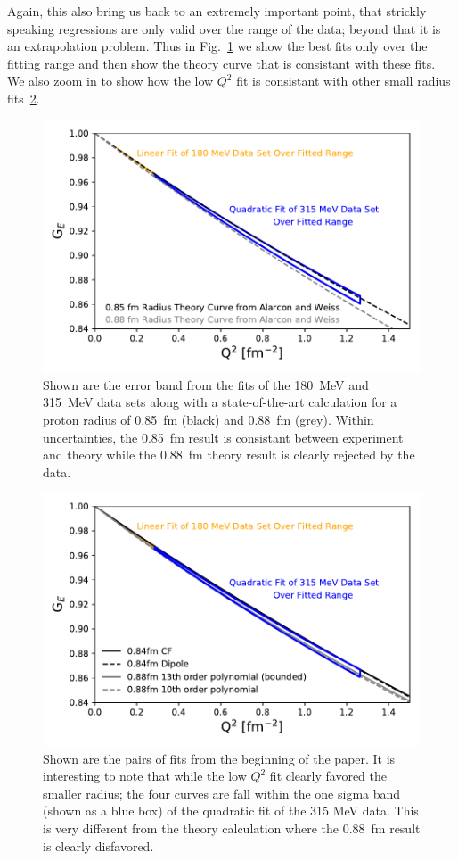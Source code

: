 \documentclass[10pt,aps,prc,twocolumn]{revtex4-1}
\begin{document}
Again, this also bring us back to an extremely important point, that strickly speaking regressions are only 
valid over the range of the data; beyond that it is an extrapolation problem.
Thus in Fig.~\ref{FitsAndTheory} we show the best fits only over the fitting range and then show the theory
curve that is consistant with these fits.   We also zoom in to show how the low $Q^2$ fit is consistant with
other small radius fits~\ref{FitsAndOtherFits}.

\begin{figure}[htb]
\includegraphics[width=\columnwidth]{Figure/FitsAndTheory.pdf}
\caption{Shown are the error band from the fits of the 180~MeV and 315~MeV data sets along with a state-of-the-art
calculation for a proton radius of 0.85~fm (black) and 0.88~fm (grey).   Within uncertainties, the 0.85~fm result is
consistant between experiment and theory while the 0.88~fm theory result is clearly rejected by the data.}
\label{FitsAndTheory}
\end{figure}

\begin{figure}[htb]
\includegraphics[width=\columnwidth]{Figure/FitsAndFits.pdf}
\caption{Shown are the pairs of fits from the beginning of the paper.   It is interesting to note that while the
low $Q^2$ fit clearly favored the smaller radius; the four curves are fall within the one sigma band (shown as a blue box) 
of the quadratic fit of the 315 MeV data.   This is very different from the theory calculation where the 0.88~fm result
is clearly disfavored.}
\label{FitsAndOtherFits}
\end{figure}
\end{document}
